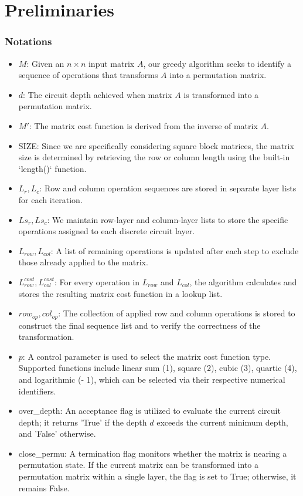 \chapter{Preliminaries}
\subsection{Notations}
\begin{itemize}
    \item $M$: Given an $n \times n$ input matrix $A$, our greedy algorithm seeks to identify a sequence of operations that transforms $A$ into a permutation matrix.
\item $d$: The circuit depth achieved when matrix $A$ is transformed into a permutation matrix.
\item $M'$: The matrix cost function is derived from the inverse of matrix $A$.
\item SIZE: Since we are specifically considering square block matrices, the matrix size is determined by retrieving the row or column length using the built-in `length()` function.
\item $L_{r}, L_{c}$: Row and column operation sequences are stored in separate layer lists for each iteration.
\item $Ls_{r}, Ls_{c}$: We maintain row-layer and column-layer lists to store the specific operations assigned to each discrete circuit layer.
\item $L_{row}, L_{col}$: A list of remaining operations is updated after each step to exclude those already applied to the matrix.
\item $L_{row}^{cost}, L_{col}^{cost}$: For every operation in $L_{row}$ and $L_{col}$, the algorithm calculates and stores the resulting matrix cost function in a lookup list.
\item $row_{op}, col_{op}$: The collection of applied row and column operations is stored to construct the final sequence list and to verify the correctness of the transformation.
\item $p$: A control parameter is used to select the matrix cost function type. Supported functions include linear sum (1), square (2), cubic (3), quartic (4), and logarithmic (- 1), which can be selected via their respective numerical identifiers.
\item over\_depth: An acceptance flag is utilized to evaluate the current circuit depth; it returns 'True' if the depth $d$ exceeds the current minimum depth, and 'False' otherwise.
\item close\_permu: A termination flag monitors whether the matrix is nearing a permutation state. If the current matrix can be transformed into a permutation matrix within a single layer, the flag is set to True; otherwise, it remains False.

\end{itemize}
